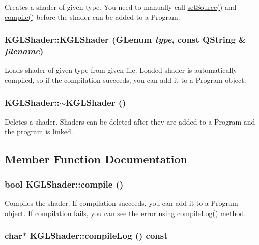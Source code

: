 Creates a shader of given type. You need to manually call \hyperlink{class_k_g_l_shader_053304f7caa6280d1485f4c89ef2d76f}{setSource()} and \hyperlink{class_k_g_l_shader_4ab00f3c14eac360fa989209831bc157}{compile()} before the shader can be added to a Program. \hypertarget{class_k_g_l_shader_a314186b1c41653d6418c9cbcc673ca7}{
\subsubsection[{KGLShader}]{\setlength{\rightskip}{0pt plus 5cm}KGLShader::KGLShader (GLenum {\em type}, \/  const QString \& {\em filename})}}
\label{class_k_g_l_shader_a314186b1c41653d6418c9cbcc673ca7}


Loads shader of given type from given file. Loaded shader is automatically compiled, so if the compilation succeeds, you can add it to a Program object. \hypertarget{class_k_g_l_shader_bec62fc31823215df69160d442944bfc}{
\subsubsection[{$\sim$KGLShader}]{\setlength{\rightskip}{0pt plus 5cm}KGLShader::$\sim$KGLShader ()}}
\label{class_k_g_l_shader_bec62fc31823215df69160d442944bfc}


Deletes a shader. Shaders can be deleted after they are added to a Program and the program is linked. 

\subsection{Member Function Documentation}
\hypertarget{class_k_g_l_shader_4ab00f3c14eac360fa989209831bc157}{
\subsubsection[{compile}]{\setlength{\rightskip}{0pt plus 5cm}bool KGLShader::compile ()}}
\label{class_k_g_l_shader_4ab00f3c14eac360fa989209831bc157}


Compiles the shader. If compilation succeeds, you can add it to a Program object. If compilation fails, you can see the error using \hyperlink{class_k_g_l_shader_f42dca3d4d145a34ea2c2382699a2f19}{compileLog()} method. \hypertarget{class_k_g_l_shader_f42dca3d4d145a34ea2c2382699a2f19}{
\subsubsection[{compileLog}]{\setlength{\rightskip}{0pt plus 5cm}char$\ast$ KGLShader::compileLog () const}}
\label{class_k_g_l_shader_f42dca3d4d145a34ea2c2382699a2f19}


